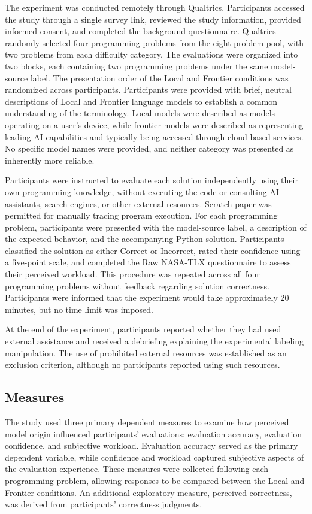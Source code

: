 \documentclass[manuscript,review]{acmart}
\begin{document}
The experiment was conducted remotely through Qualtrics. Participants accessed the study through a single survey link, reviewed the study information, provided informed consent, and completed the background questionnaire. Qualtrics randomly selected four programming problems from the eight-problem pool, with two problems from each difficulty category. The evaluations were organized into two blocks, each containing two programming problems under the same model-source label. The presentation order of the Local and Frontier conditions was randomized across participants. Participants were provided with brief, neutral descriptions of Local and Frontier language models to establish a common understanding of the terminology. Local models were described as models operating on a user's device, while frontier models were described as representing leading AI capabilities and typically being accessed through cloud-based services. No specific model names were provided, and neither category was presented as inherently more reliable.

Participants were instructed to evaluate each solution independently using their own programming knowledge, without executing the code or consulting AI assistants, search engines, or other external resources. Scratch paper was permitted for manually tracing program execution. For each programming problem, participants were presented with the model-source label, a description of the expected behavior, and the accompanying Python solution. Participants classified the solution as either Correct or Incorrect, rated their confidence using a five-point scale, and completed the Raw NASA-TLX questionnaire to assess their perceived workload. This procedure was repeated across all four programming problems without feedback regarding solution correctness. Participants were informed that the experiment would take approximately 20 minutes, but no time limit was imposed.

At the end of the experiment, participants reported whether they had used external assistance and received a debriefing explaining the experimental labeling manipulation. The use of prohibited external resources was established as an exclusion criterion, although no participants reported using such resources.


\subsection{Measures}

The study used three primary dependent measures to examine how perceived model origin influenced participants' evaluations: evaluation accuracy, evaluation confidence, and subjective workload. Evaluation accuracy served as the primary dependent variable, while confidence and workload captured subjective aspects of the evaluation experience. These measures were collected following each programming problem, allowing responses to be compared between the Local and Frontier conditions. An additional exploratory measure, perceived correctness, was derived from participants' correctness judgments.
\end{document}
